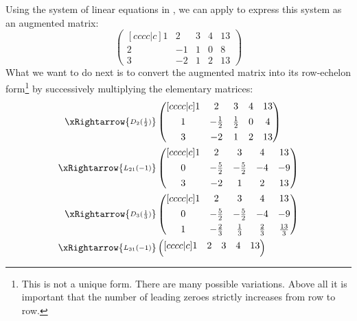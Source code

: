 \begin{exm}\label{exm-gauss-jordan-elimination}
	Using the system of linear equations in ,
	we can apply  to express this system
	as an augmented matrix:
	\begin{equation*}
		\begin{pmatrix}[cccc|c]
			1 & 2  & 3 & 4 & 13 \\
			2 & -1 & 1 & 0 & 8  \\
			3 & -2 & 1 & 2 & 13
		\end{pmatrix}
	\end{equation*}
	What we want to do next is to convert the augmented matrix into its row-echelon
	form\footnote{This is not a unique form. There are many possible variations.
		Above all it is important that the number of leading zeroes strictly increases
		from row to row.} by successively multiplying the elementary matrices:
	\begin{align*}
		\xRightarrow{\substack{D_2(\frac{1}{2})}}
		 & \begin{pmatrix}[cccc|c]
			1 & 2            & 3           & 4 & 13 \\[4pt]
			1 & -\frac{1}{2} & \frac{1}{2} & 0 & 4  \\[4pt]
			3 & -2           & 1           & 2 & 13
		\end{pmatrix}            \\
		\xRightarrow{\substack{L_{21}(-1)}}
		 & \begin{pmatrix}[cccc|c]
			1 & 2            & 3            & 4  & 13 \\[4pt]
			0 & -\frac{5}{2} & -\frac{5}{2} & -4 & -9 \\[4pt]
			3 & -2           & 1            & 2  & 13
		\end{pmatrix}            \\
		\xRightarrow{\substack{D_3(\frac{1}{3})}}
		 & \begin{pmatrix}[cccc|c]
			1 & 2            & 3            & 4           & 13           \\[4pt]
			0 & -\frac{5}{2} & -\frac{5}{2} & -4          & -9           \\[4pt]
			1 & -\frac{2}{3} & \frac{1}{3}  & \frac{2}{3} & \frac{13}{3}
		\end{pmatrix}            \\
		\xRightarrow{\substack{L_{31}(-1)}}
		 & \begin{pmatrix}[cccc|c]
			1 & 2            & 3            & 4             & 13            \\[4pt]

\end{pmatrix}
\end{align*}
\end{exm}
